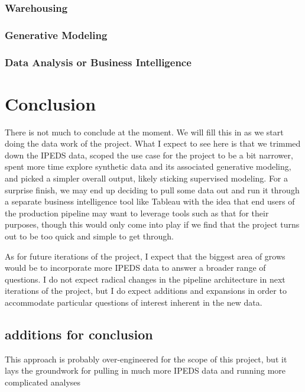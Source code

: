 \documentclass[sigconf, authorversion, nonacm]{acmart}
\begin{document}
    \subsubsection{Warehousing}
    \subsubsection{Generative Modeling}
    \subsubsection{Data Analysis or Business Intelligence}

\section{Conclusion}
    There is not much to conclude at the moment. We will fill this in as we start doing the data work of the project. What I expect to see here is that we trimmed down the IPEDS data, scoped the use case for the project to be a bit narrower, spent more time explore synthetic data and its associated generative modeling, and picked a simpler overall output, likely sticking supervised modeling. For a surprise finish, we may end up deciding to pull some data out and run it through a separate business intelligence tool like Tableau with the idea that end users of the production pipeline may want to leverage tools such as that for their purposes, though this would only come into play if we find that the project turns out to be too quick and simple to get through.

    As for future iterations of the project, I expect that the biggest area of grows would be to incorporate more IPEDS data to answer a broader range of questions. I do not expect radical changes in the pipeline architecture in next iterations of the project, but I do expect additions and expansions in order to accommodate particular questions of interest inherent in the new data.

    \subsection{additions for conclusion}

    This approach is probably over-engineered for the scope of this project, but it lays the groundwork for pulling in much more IPEDS data and running more complicated analyses



\end{document}

